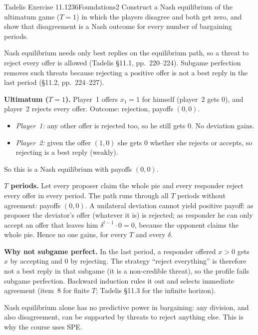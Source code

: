 \begin{exsol}{Tadelis Exercise 11.1}{236}{Foundations}{2}
\asked Construct a Nash equilibrium of the ultimatum game ($T = 1$) in which the players disagree
and both get zero, and show that disagreement is a Nash outcome for every number of bargaining periods.

\method Nash equilibrium needs only best replies on the equilibrium path, so a threat to reject
every offer is allowed (Tadelis \S11.1, pp.~220--224). Subgame perfection removes such threats because
rejecting a positive offer is not a best reply in the last period (\S11.2, pp.~224--227).

\solution
\textbf{Ultimatum ($T = 1$).} Player~1 offers $x_1 = 1$ for himself (player~2 gets $0$), and player~2
rejects every offer. Outcome: rejection, payoffs $(0, 0)$.
\begin{itemize}
  \item \emph{Player~1:} any other offer is rejected too, so he still gets $0$. No deviation gains.
  \item \emph{Player~2:} given the offer $(1, 0)$ she gets $0$ whether she rejects or accepts, so rejecting is
  a best reply (weakly).
\end{itemize}
So this is a Nash equilibrium with payoffs $(0,0)$.

\textbf{$T$ periods.} Let every proposer claim the whole pie and every responder reject every offer
in every period. The path runs through all $T$ periods without agreement: payoffs $(0,0)$. A unilateral
deviation cannot yield positive payoff: as proposer the deviator's offer (whatever it is) is rejected;
as responder he can only accept an offer that leaves him $\delta^{t-1}\cdot 0 = 0$, because the opponent
claims the whole pie. Hence no one gains, for every $T$ and every $\delta$.

\textbf{Why not subgame perfect.} In the last period, a responder offered $x > 0$ gets $x$ by accepting
and $0$ by rejecting. The strategy ``reject everything'' is therefore not a best reply in that
subgame (it is a non-credible threat), so the profile fails subgame perfection. Backward induction
rules it out and selects immediate agreement (item~8 for finite $T$; Tadelis \S11.3 for the infinite horizon).

\interp Nash equilibrium alone has no predictive power in bargaining: any division, and also
disagreement, can be supported by threats to reject anything else. This is why the course uses SPE.


\end{exsol}
